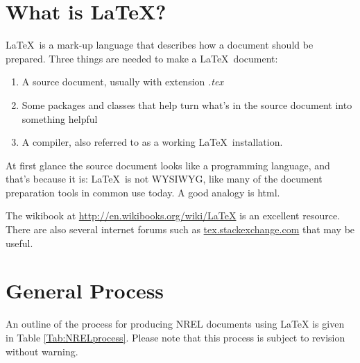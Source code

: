 \documentclass[12pt,letterpaper]{report}
\begin{document}
\section{What is \LaTeX?}
\label{sec:examples}

\LaTeX\ is a mark-up language that describes how a document should be prepared. Three things are needed to make a \LaTeX\ document:
\begin{enumerate}
\item A source document, usually with extension \emph{.tex}
\item Some packages and classes that help turn what's in the source document into something helpful
\item A compiler, also referred to as a working \LaTeX\ installation.
\end{enumerate}

At first glance the source document looks like a programming language, and that's because it is: \LaTeX\ is not WYSIWYG, like many of the document preparation tools in common use today. A good analogy is html.

The wikibook at \url{http://en.wikibooks.org/wiki/LaTeX} is an excellent resource. There are also several internet forums such as \url{tex.stackexchange.com} that may be useful.

\section{General Process}
An outline of the process for producing NREL documents using \LaTeX{} is given in Table \ref{Tab:NRELprocess}. Please note that this process is subject to revision without warning.
\end{document}
